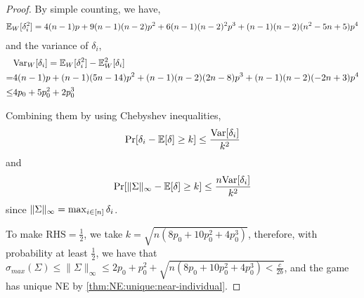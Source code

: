 \begin{proof}
By simple counting, we have,
\begin{align*}
    \mathbb{E}_W[\delta_i^2] = 4(n-1)p + 9(n-1)(n-2)p^2 + 6(n-1)(n-2)^2 p^3 + (n-1)(n-2)(n^2-5n+5) p^4
\end{align*}
and the variance of $\delta_i$,
\begin{align*}
    & \mathrm{Var}_W [\delta_i] = \mathbb{E}_W [\delta_i^2] - \mathbb{E}_W^2[\delta_i]
    \\
    =& 4(n-1)p + (n-1)(5n-14)p^2 + (n-1)(n-2)(2n-8)p^3 + (n-1)(n-2)(-2n+3)p^4
    \\
    \le& 4p_0 + 5p_0^2 + 2 p_0^3
\end{align*}

Combining them by using Chebyshev inequalities, 
\begin{align*}
    \Pr[\delta_i - \mathbb{E}[\delta] \ge k]\le \frac{\mathrm{Var}[\delta_i]}{k^2}
\end{align*}
and
\begin{align*}
    \Pr[\| \Sigma \|_\infty - \mathbb{E}[\delta] \ge k]\le \frac{n\mathrm{Var}[\delta_i]}{k^2}
\end{align*}
since $\| \Sigma \|_\infty = \max_{i\in[n]} \delta_i$.

To make $\mathrm{RHS} = \frac{1}{2}$, we take $k = \sqrt{n(8p_0 + 10 p_0^2 + 4 p_0^3)}$, therefore, with probability at least $\frac{1}{2}$, we have that $\sigma_{max}(\Sigma) \le \| \Sigma \|_\infty \le 2p_0 + p_0^2 + \sqrt{n(8p_0 + 10 p_0^2 + 4 p_0^3)< \frac{c}{2b}}$, and the game has unique NE by \cref{thm:NE:unique:near-individual}.
    
\end{proof}